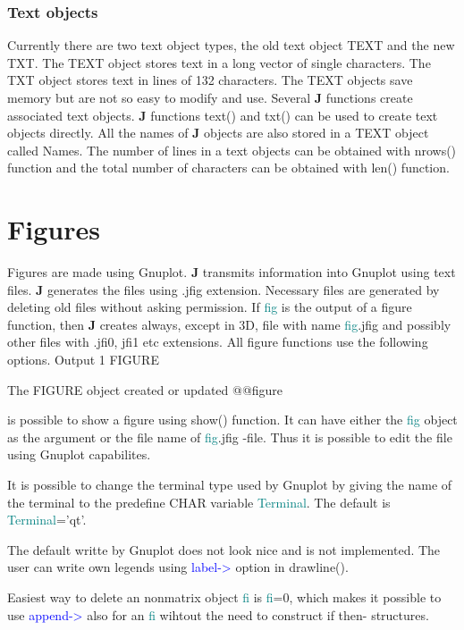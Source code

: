 \subsubsection{Text objects}
\label{textob}
Currently there are two text object types, the old text object TEXT and the new
TXT. The TEXT object stores text in a long vector of single characters. The TXT
object stores text in lines of 132 characters. The TEXT objects save memory but
are not so easy to modify and use. Several \textbf{J}
functions create associated text objects. \textbf{J} functions \textcolor{VioletRed}{text}() and \textcolor{VioletRed}{txt}()
can be used to
create text objects directly. All the names of \textbf{J} objects are also stored in a
TEXT object called Names. The number of lines in a text objects can be obtained
with \textcolor{VioletRed}{nrows}() function and the total number of characters can be obtained with
\textcolor{VioletRed}{len}() function.
\section{Figures}
\label{figu}
Figures are made using Gnuplot. \textbf{J} transmits information into Gnuplot using text files.
\textbf{J} generates the files using .jfig extension. Necessary files are generated  by deleting old
files without asking permission. If \textcolor{teal}{fig} is the output of a figure function, then
\textbf{J} creates always, except in 3D, file with name \textcolor{teal}{fig}.jfig and possibly other files with
.jfi0, jfi1  etc extensions.
All figure functions use the following options.
\vspace{0.3cm}
\hline
\vspace{0.3cm}
\noindent Output  \tabto{3cm}  1 \tabto{5cm}   FIGURE  \tabto{7cm}
\begin{changemargin}{3cm}{0cm}
\noindent  The FIGURE object created or updated
@@figure
\end {changemargin}
\hline
\vspace{0.2cm}
\begin{note}
is possible to show a figure using \textcolor{VioletRed}{show}() function. It can have either the \textcolor{teal}{fig} object as the
argument or the file name of \textcolor{teal}{fig}.jfig -file. Thus it is possible
to edit the file using Gnuplot capabilites.
\end{note}
\begin{note}
It is possible to change the terminal type used by Gnuplot by giving
the name of the terminal to the predefine CHAR variable \textcolor{teal}{Terminal}.
The default is \newline \textcolor{teal}{Terminal}='qt'.
\end{note}
\begin{note}
The default writte by Gnuplot does not look nice and is not implemented.
The user can write own legends using \textcolor{blue}{label->} option in \textcolor{VioletRed}{drawline}().
\end{note}
\begin{note}
Easiest way to delete an nonmatrix object \textcolor{teal}{fi} is \textcolor{teal}{fi}=0, which makes it possible
to use \textcolor{blue}{append->} also for an \textcolor{teal}{fi} wihtout the need to construct if then-
structures.
\end{note}
